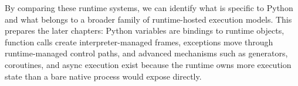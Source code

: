 By comparing these runtime systems, we can identify what is specific to Python and what belongs to a broader family of runtime-hosted execution models. This prepares the later chapters: Python variables are bindings to runtime objects, function calls create interpreter-managed frames, exceptions move through runtime-managed control paths, and advanced mechanisms such as generators, coroutines, and async execution exist because the runtime owns more execution state than a bare native process would expose directly.